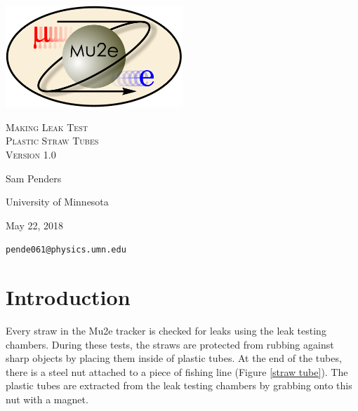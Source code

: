 \documentclass[letterpaper,12pt]{article}
\begin{document}
\begin{titlepage}
	\centering
	\includegraphics[width=0.5\textwidth]{mu2e_logo_oval.png}\par\vspace{2cm}
	{\scshape\LARGE Making Leak Test\\ Plastic Straw Tubes \\ Version 1.0\par}	\vspace{3cm}
	{\Large Sam Penders\par}
	\vspace{3cm}
	{\large University of Minnesota\par}
 	\vspace{.5cm}
	{\large May 22, 2018\par}
	\vfill
	{\verb|pende061@physics.umn.edu|\par}
\end{titlepage}

\clearpage
\setcounter{page}{2}


\section{Introduction}
Every straw in the Mu2e tracker is checked for leaks using the leak testing chambers. During these tests, the straws are protected from rubbing against sharp objects by placing them inside of plastic tubes. At the end of the tubes, there is a steel nut attached to a piece of fishing line (Figure \ref{straw tube}). The plastic tubes are extracted from the leak testing chambers by grabbing onto this nut with a magnet.
\end{document}

